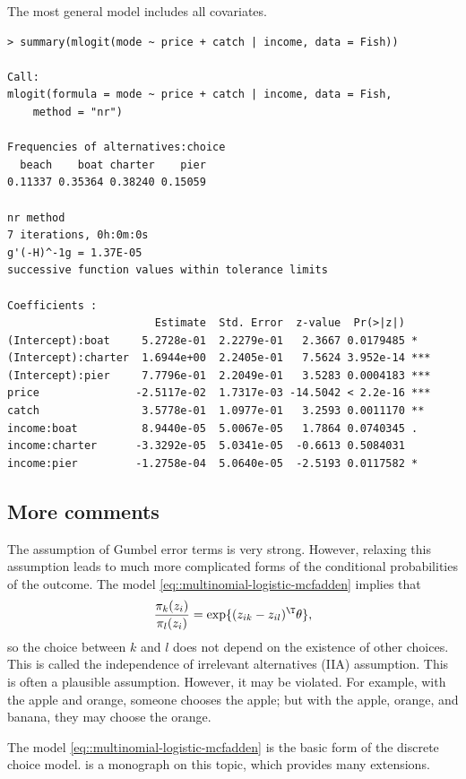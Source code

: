 The most general model includes all covariates.

\begin{lstlisting}
> summary(mlogit(mode ~ price + catch | income, data = Fish))

Call:
mlogit(formula = mode ~ price + catch | income, data = Fish, 
    method = "nr")

Frequencies of alternatives:choice
  beach    boat charter    pier 
0.11337 0.35364 0.38240 0.15059 

nr method
7 iterations, 0h:0m:0s 
g'(-H)^-1g = 1.37E-05 
successive function values within tolerance limits 

Coefficients :
                       Estimate  Std. Error  z-value  Pr(>|z|)    
(Intercept):boat     5.2728e-01  2.2279e-01   2.3667 0.0179485 *  
(Intercept):charter  1.6944e+00  2.2405e-01   7.5624 3.952e-14 ***
(Intercept):pier     7.7796e-01  2.2049e-01   3.5283 0.0004183 ***
price               -2.5117e-02  1.7317e-03 -14.5042 < 2.2e-16 ***
catch                3.5778e-01  1.0977e-01   3.2593 0.0011170 ** 
income:boat          8.9440e-05  5.0067e-05   1.7864 0.0740345 .  
income:charter      -3.3292e-05  5.0341e-05  -0.6613 0.5084031    
income:pier         -1.2758e-04  5.0640e-05  -2.5193 0.0117582 *  
\end{lstlisting}


\subsection{More comments}


The assumption of Gumbel error terms is very strong. However, relaxing this assumption leads to much more complicated forms of the conditional probabilities of the outcome. The model \eqref{eq::multinomial-logistic-mcfadden} implies that 
$$
\frac{  \pi_k(z_i) }{ \pi_l(z_i) } = \exp\{  (z_{ik} - z_{il})^{\T} \theta   \},
$$
so the choice between $k$ and $l$ does not depend on the existence of other choices. This is called the
independence of irrelevant alternatives (IIA) assumption. This is often a plausible assumption. However, it may be violated. For example, with the apple and orange, someone chooses the apple; but with the apple, orange, and banana, they may choose the orange.

The model \eqref{eq::multinomial-logistic-mcfadden}  is the basic form of the discrete choice model. \citet{train2009discrete} is a monograph on this topic, which provides many extensions.





